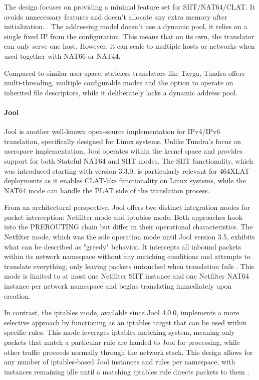 The design focuses on providing a minimal feature set for SIIT/NAT64/CLAT. It avoids unnecessary features and doesn’t allocate any extra memory after initialization. \cite{labuda_tundra_nat64}. The addressing model doesn’t use a dynamic pool, it relies on a single fixed IP from the configuration. This means that on its own, the translator can only serve one host. However, it can scale to multiple hosts or networks when used together with NAT66 or NAT44\cite{labuda_tundra_nat64}.

Compared to similar user-space, stateless translators like Tayga, Tundra offers multi-threading, multiple configurable modes and the option to operate on inherited file descriptors, while it deliberately lacks a dynamic address pool\cite{labuda_tundra_nat64}. 

\paragraph{Jool} 


Jool is another well-known open-source implementation for IPv4/IPv6 translation, specifically designed for Linux systems\cite{jool_introduction}. Unlike Tundra's focus on userspace implementation, Jool operates within the kernel space and provides support for both Stateful NAT64 and SIIT modes. The SIIT functionality, which was introduced starting with version 3.3.0, is particularly relevant for 464XLAT deployments as it enables CLAT-like functionality on Linux systems, while the NAT64 mode can handle the PLAT side of the translation process\cite{jool_introduction}.

From an architectural perspective, Jool offers two distinct integration modes for packet interception: Netfilter mode and iptables mode. Both approaches hook into the PREROUTING chain but differ in their operational characteristics\cite{jool_introduction}. The Netfilter mode, which was the sole operation mode until Jool version 3.5, exhibits what can be described as "greedy" behavior. It intercepts all inbound packets within its network namespace without any matching conditions and attempts to translate everything, only leaving packets untouched when translation fails \cite{jool_introduction}. This mode is limited to at most one Netfilter SIIT instance and one Netfilter NAT64 instance per network namespace and begins translating immediately upon creation.

In contrast, the iptables mode, available since Jool 4.0.0, implements a more selective approach by functioning as an iptables target that can be used within specific rules\cite{jool_introduction}. This mode leverages iptables matching system, meaning only packets that match a particular rule are handed to Jool for processing, while other traffic proceeds normally through the network stack. This design allows for any number of iptables-based Jool instances and rules per namespace, with instances remaining idle until a matching iptables rule directs packets to them \cite{jool_introduction}.

